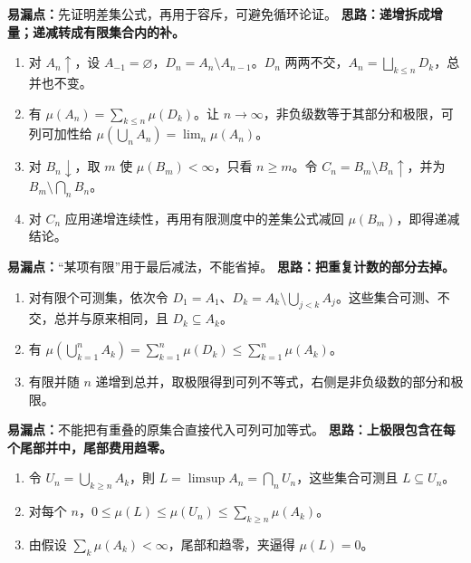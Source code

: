\textbf{易漏点：}先证明差集公式，再用于容斥，可避免循环论证。
\textbf{思路：递增拆成增量；递减转成有限集合内的补。}
\begin{enumerate}
\item 对 $A_n\uparrow$，设 $A_{-1}=\varnothing$，$D_n=A_n\setminus A_{n-1}$。$D_n$ 两两不交，$A_n=\bigsqcup_{k\le n}D_k$，总并也不变。
\item 有 $\mu(A_n)=\sum_{k\le n}\mu(D_k)$。让 $n\to\infty$，非负级数等于其部分和极限，可列可加性给 $\mu(\bigcup_n A_n)=\lim_n\mu(A_n)$。
\item 对 $B_n\downarrow$，取 $m$ 使 $\mu(B_m)<\infty$，只看 $n\ge m$。令 $C_n=B_m\setminus B_n\uparrow$，并为 $B_m\setminus\bigcap_n B_n$。
\item 对 $C_n$ 应用递增连续性，再用有限测度中的差集公式减回 $\mu(B_m)$，即得递减结论。
\end{enumerate}
\textbf{易漏点：}“某项有限”用于最后减法，不能省掉。
\textbf{思路：把重复计数的部分去掉。}
\begin{enumerate}
\item 对有限个可测集，依次令 $D_1=A_1$、$D_k=A_k\setminus\bigcup_{j<k}A_j$。这些集合可测、不交，总并与原来相同，且 $D_k\subseteq A_k$。
\item 有 $\mu(\bigcup_{k=1}^n A_k)=\sum_{k=1}^n\mu(D_k)\le\sum_{k=1}^n\mu(A_k)$。
\item 有限并随 $n$ 递增到总并，取极限得到可列不等式，右侧是非负级数的部分和极限。
\end{enumerate}
\textbf{易漏点：}不能把有重叠的原集合直接代入可列可加等式。
\textbf{思路：上极限包含在每个尾部并中，尾部费用趋零。}
\begin{enumerate}
\item 令 $U_n=\bigcup_{k\ge n}A_k$，則 $L=\limsup A_n=\bigcap_n U_n$，这些集合可测且 $L\subseteq U_n$。
\item 对每个 $n$，$0\le\mu(L)\le\mu(U_n)\le\sum_{k\ge n}\mu(A_k)$。
\item 由假设 $\sum_k\mu(A_k)<\infty$，尾部和趋零，夹逼得 $\mu(L)=0$。
\end{enumerate}

